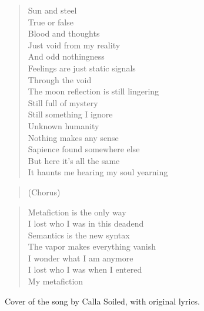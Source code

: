 \begin{minipage}{0.55\textwidth}

    \begin{verse}
    Sun and steel \\
	True or false  \\
	Blood and thoughts \\
	Just void from my reality \\
	And odd nothingness \\
	Feelings are just static signals \\
	Through the void \\
	The moon reflection is still lingering \\
	Still full of mystery \\
	Still something I ignore \\
	Unknown humanity \\
	Nothing makes any sense \\
	Sapience found somewhere else \\
	But here it's all the same \\
	It haunts me hearing my soul yearning
    \end{verse}

    \begin{verse}
    (Chorus)
    \end{verse}

    \begin{verse}
    Metafiction is the only way \\
	I lost who I was in this deadend \\
	Semantics is the new syntax \\
	The vapor makes everything vanish \\
	I wonder what I am anymore \\
	I lost who I was when I entered \\
	My metafiction
    \end{verse}

\end{minipage}

\vspace{1cm}
Cover of the song by Calla Soiled, with original lyrics.

\clearpage
